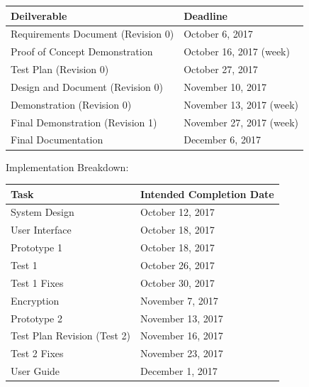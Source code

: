 \documentclass[12pt, titlepage]{article}
\begin{document}
\begin{table}
\begin{center}
\begin{tabular}{ | p{5cm} | p{9cm} | }
	\hline
	Deilverable & Deadline \\
	\hline
	Requirements Document (Revision 0) & October 6, 2017 \\
	\hline
	Proof of Concept Demonstration & October 16, 2017 (week) \\
	\hline
	Test Plan (Revision 0) & October 27, 2017 \\
	\hline
	Design and Document (Revision 0) & November 10, 2017 \\
	\hline
	Demonstration (Revision 0) & November 13, 2017 (week) \\
	\hline
	Final Demonstration (Revision 1) & November 27, 2017 (week) \\
	\hline
	Final Documentation & December 6, 2017 \\
\hline
\end{tabular}
\end{center}
\end{table}

Implementation Breakdown:

\begin{table}
\begin{center}
\begin{tabular}{ | p{5cm} | p{10cm} | }
	\hline
	Task & Intended Completion Date \\
	\hline
	System Design & October 12, 2017 \\
	\hline
	User Interface & October 18, 2017 \\
	\hline
	Prototype 1 & October 18, 2017 \\
	\hline
	Test 1 & October 26, 2017 \\
	\hline
	Test 1 Fixes & October 30, 2017 \\
	\hline
	Encryption & November 7, 2017 \\
	\hline
	Prototype 2 & November 13, 2017 \\
	\hline
	Test Plan Revision (Test 2) & November 16, 2017 \\
	\hline
	Test 2 Fixes & November 23, 2017 \\
	\hline
	User Guide & December 1, 2017 \\
\hline
\end{tabular}
\end{center}
\end{table}
\end{document}
